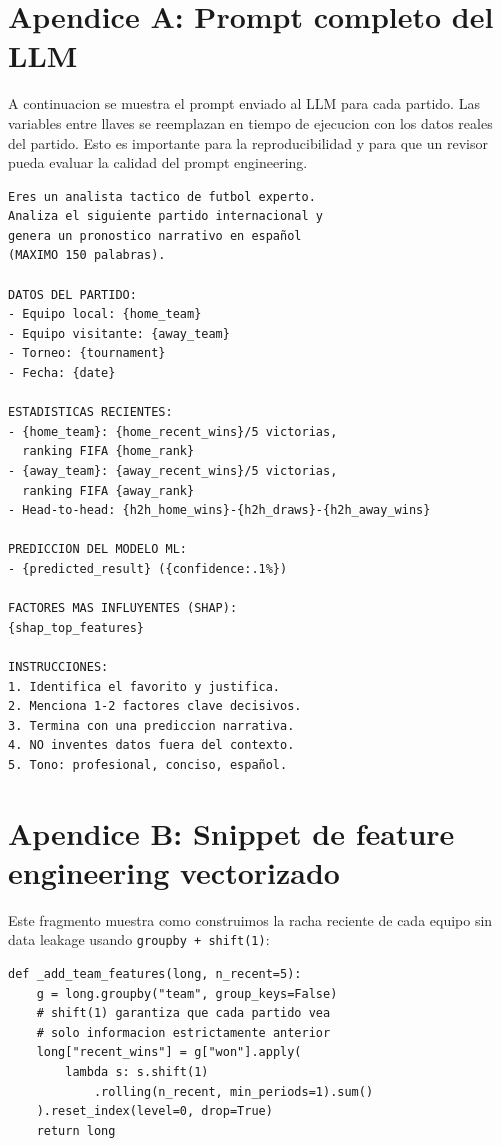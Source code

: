 \documentclass[10pt,twocolumn]{article}
\begin{document}
\appendix

\section{Apendice A: Prompt completo del LLM}

A continuacion se muestra el prompt enviado al LLM para cada partido. Las variables entre llaves se reemplazan en tiempo de ejecucion con los datos reales del partido. Esto es importante para la reproducibilidad y para que un revisor pueda evaluar la calidad del prompt engineering.

\begin{lstlisting}[caption={Prompt completo (PROMPT\_PRE\_MATCH).}, basicstyle=\ttfamily\tiny]
Eres un analista tactico de futbol experto.
Analiza el siguiente partido internacional y
genera un pronostico narrativo en español
(MAXIMO 150 palabras).

DATOS DEL PARTIDO:
- Equipo local: {home_team}
- Equipo visitante: {away_team}
- Torneo: {tournament}
- Fecha: {date}

ESTADISTICAS RECIENTES:
- {home_team}: {home_recent_wins}/5 victorias,
  ranking FIFA {home_rank}
- {away_team}: {away_recent_wins}/5 victorias,
  ranking FIFA {away_rank}
- Head-to-head: {h2h_home_wins}-{h2h_draws}-{h2h_away_wins}

PREDICCION DEL MODELO ML:
- {predicted_result} ({confidence:.1%})

FACTORES MAS INFLUYENTES (SHAP):
{shap_top_features}

INSTRUCCIONES:
1. Identifica el favorito y justifica.
2. Menciona 1-2 factores clave decisivos.
3. Termina con una prediccion narrativa.
4. NO inventes datos fuera del contexto.
5. Tono: profesional, conciso, español.
\end{lstlisting}

\section{Apendice B: Snippet de feature engineering vectorizado}

Este fragmento muestra como construimos la racha reciente de cada equipo sin data leakage usando \texttt{groupby + shift(1)}:

\begin{lstlisting}[caption={Vectorizacion de racha reciente.}, basicstyle=\ttfamily\tiny]
def _add_team_features(long, n_recent=5):
    g = long.groupby("team", group_keys=False)
    # shift(1) garantiza que cada partido vea
    # solo informacion estrictamente anterior
    long["recent_wins"] = g["won"].apply(
        lambda s: s.shift(1)
            .rolling(n_recent, min_periods=1).sum()
    ).reset_index(level=0, drop=True)
    return long
\end{lstlisting}
\end{document}
